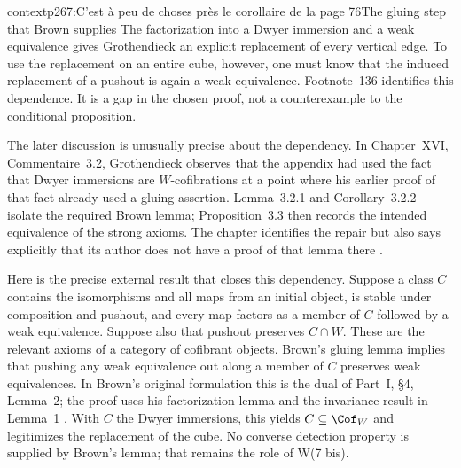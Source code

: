 \begin{dcomment}{context}{p267:C'est à peu de choses près le corollaire de la page 76}{The gluing step that Brown supplies}
The factorization into a Dwyer immersion and a weak equivalence gives Grothendieck an explicit replacement of every vertical edge. To use the replacement on an entire cube, however, one must know that the induced replacement of a pushout is again a weak equivalence. Footnote~136 identifies this dependence. It is a gap in the chosen proof, not a counterexample to the conditional proposition.

The later discussion is unusually precise about the dependency. In Chapter~XVI, Commentaire~3.2, Grothendieck observes that the appendix had used the fact that Dwyer immersions are $W$-cofibrations at a point where his earlier proof of that fact already used a gluing assertion. Lemma~3.2.1 and Corollary~3.2.2 isolate the required Brown lemma; Proposition~3.3 then records the intended equivalence of the strong axioms. The chapter identifies the repair but also says explicitly that its author does not have a proof of that lemma there \citep[\S3, ms.~pp.~18--23]{GrothendieckDerivateursXVI}.

Here is the precise external result that closes this dependency. Suppose a class $C$ contains the isomorphisms and all maps from an initial object, is stable under composition and pushout, and every map factors as a member of $C$ followed by a weak equivalence. Suppose also that pushout preserves $C\cap W$. These are the relevant axioms of a category of cofibrant objects. Brown's gluing lemma implies that pushing any weak equivalence out along a member of $C$ preserves weak equivalences. In Brown's original formulation this is the dual of Part~I, \S4, Lemma~2; the proof uses his factorization lemma and the invariance result in Lemma~1 \citep[pp.~428--429]{Brown1973}. With $C$ the Dwyer immersions, this yields $C\subseteq\Cof_W$ and legitimizes the replacement of the cube. No converse detection property is supplied by Brown's lemma; that remains the role of W(7 bis).
\end{dcomment}

